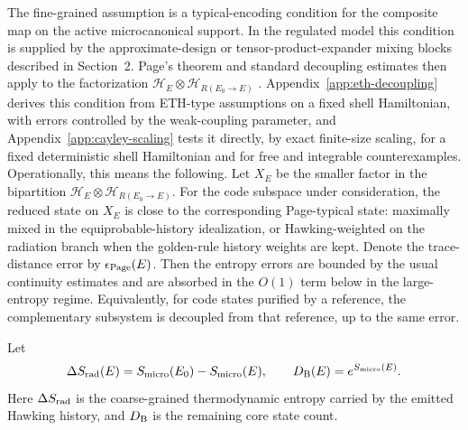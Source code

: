 \documentclass[12pt]{article}
\newcommand{\Smicro}{S_{\rm micro}}
\begin{document}
The fine-grained assumption is a typical-encoding condition for the composite
map on the active microcanonical support.  In the regulated model this
condition is supplied by the approximate-design or tensor-product-expander
mixing blocks described in Section~2.  Page's theorem and standard decoupling
estimates then apply to the factorization
$\mathcal H_E\otimes \mathcal H_{R(E_0\to E)}$
\cite{Page1993Average,Page1993Info,HaydenHorodeckiWinterYard2008}.
Appendix~\ref{app:eth-decoupling} derives this condition from ETH-type
assumptions on a fixed shell Hamiltonian, with errors controlled by the
weak-coupling parameter, and Appendix~\ref{app:cayley-scaling} tests it
directly, by exact finite-size scaling, for a fixed deterministic shell
Hamiltonian and for free and integrable counterexamples.
Operationally, this means the following.  Let $X_E$ be the smaller factor in
the bipartition
$\mathcal H_E\otimes\mathcal H_{R(E_0\to E)}$.  For the code subspace under
consideration, the reduced state on $X_E$ is close to the corresponding
Page-typical state: maximally mixed in the equiprobable-history idealization,
or Hawking-weighted on the radiation branch when the golden-rule history
weights are kept.  Denote the trace-distance error by $\epsilon_{\rm Page}(E)$.
Then the entropy errors are bounded by the usual continuity estimates and are
absorbed in the $O(1)$ term below in the large-entropy regime.  Equivalently,
for code states purified by a reference, the complementary subsystem is
decoupled from that reference, up to the same error.

Let
\begin{equation}
    \Delta S_{\rm rad}(E)=\Smicro(E_0)-\Smicro(E),
    \qquad
    D_{\rm B}(E)=e^{\Smicro(E)}.
\end{equation}
Here $\Delta S_{\rm rad}$ is the coarse-grained thermodynamic entropy carried
by the emitted Hawking history, and $D_{\rm B}$ is the remaining core state
count.
\end{document}
